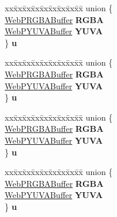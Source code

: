 \begin{DoxyCompactItemize}
\begin{tabbing}
\end{tabbing}\item 
\mbox{\label{structWebPDecBuffer_aa433a3bfd189ac87e7cdbb8bd07b5df6}} 
\begin{tabbing}
xx\=xx\=xx\=xx\=xx\=xx\=xx\=xx\=xx\=\kill
union \{\\
\>\hyperlink{structWebPRGBABuffer}{WebPRGBABuffer} {\bfseries RGBA}\\
\>\hyperlink{structWebPYUVABuffer}{WebPYUVABuffer} {\bfseries YUVA}\\
\} {\bfseries u}\\

\end{tabbing}\item 
\mbox{\label{structWebPDecBuffer_a654c070e13848f6131e2721614f9ed3a}} 
\begin{tabbing}
xx\=xx\=xx\=xx\=xx\=xx\=xx\=xx\=xx\=\kill
union \{\\
\>\hyperlink{structWebPRGBABuffer}{WebPRGBABuffer} {\bfseries RGBA}\\
\>\hyperlink{structWebPYUVABuffer}{WebPYUVABuffer} {\bfseries YUVA}\\
\} {\bfseries u}\\

\end{tabbing}\item 
\mbox{\label{structWebPDecBuffer_aa91218fdc747e75e9a47c441c9488c1e}} 
\begin{tabbing}
xx\=xx\=xx\=xx\=xx\=xx\=xx\=xx\=xx\=\kill
union \{\\
\>\hyperlink{structWebPRGBABuffer}{WebPRGBABuffer} {\bfseries RGBA}\\
\>\hyperlink{structWebPYUVABuffer}{WebPYUVABuffer} {\bfseries YUVA}\\
\} {\bfseries u}\\

\end{tabbing}\item 
\mbox{\label{structWebPDecBuffer_aff76cde0802fbc2f191ac11dba4b7718}} 
\begin{tabbing}
xx\=xx\=xx\=xx\=xx\=xx\=xx\=xx\=xx\=\kill
union \{\\
\>\hyperlink{structWebPRGBABuffer}{WebPRGBABuffer} {\bfseries RGBA}\\
\>\hyperlink{structWebPYUVABuffer}{WebPYUVABuffer} {\bfseries YUVA}\\
\} {\bfseries u}\\


\end{tabbing}
\end{DoxyCompactItemize}
